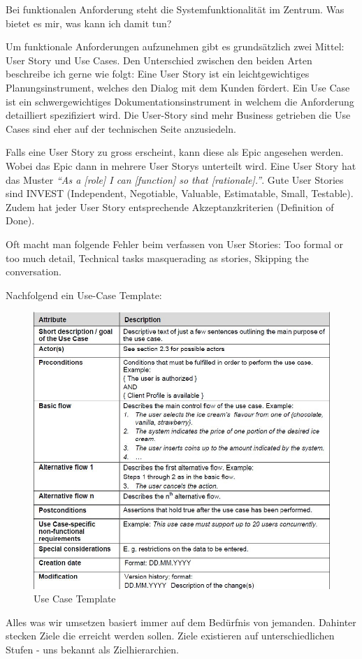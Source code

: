 Bei funktionalen Anforderung steht die Systemfunktionalität im Zentrum. Was bietet es mir, was kann ich damit tun? 

Um funktionale Anforderungen aufzunehmen gibt es grundsätzlich zwei Mittel: User Story und Use Cases. Den Unterschied zwischen den beiden Arten beschreibe ich gerne wie folgt: Eine User Story ist ein leichtgewichtiges Planungsinstrument, welches den Dialog mit dem Kunden fördert. Ein Use Case ist ein schwergewichtiges Dokumentationsinstrument in welchem die Anforderung detailliert spezifiziert wird. Die User-Story sind mehr Business getrieben die Use Cases sind eher auf der technischen Seite anzusiedeln.

Falls eine User Story zu gross erscheint, kann diese als Epic angesehen werden. Wobei das Epic dann in mehrere User Storys unterteilt wird. Eine User Story hat das Muster \emph{“As a [role] I can [function] so that [rationale].”}. Gute User Stories sind INVEST (Independent, Negotiable, Valuable, Estimatable, Small, Testable). Zudem hat jeder User Story entsprechende Akzeptanzkriterien (Definition of Done).

Oft macht man folgende Fehler beim verfassen von User Stories: Too formal or too much detail, Technical tasks masquerading as stories, Skipping the conversation.

Nachfolgend ein Use-Case Template:

\begin{figure}[h!]
\centering
\includegraphics[width=0.7\linewidth]{fig/use-case-template}
\caption{Use Case Template}
\label{fig:use-case-template}
\end{figure}

\newpage
Alles was wir umsetzen basiert immer auf dem Bedürfnis von jemanden. Dahinter stecken Ziele die erreicht werden sollen. Ziele existieren auf unterschiedlichen Stufen - uns bekannt als Zielhierarchien. 

